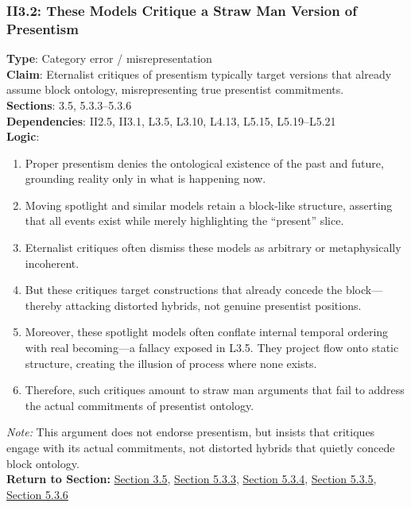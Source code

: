 \documentclass[12pt]{book}
\begin{document}
\subsubsection*{II3.2: These Models Critique a Straw Man Version of Presentism}
\label{appendix:II3.2}
\textbf{Type}: Category error / misrepresentation\\
\textbf{Claim}: Eternalist critiques of presentism typically target versions that already assume block ontology, misrepresenting true presentist commitments.\\
\textbf{Sections}: 3.5, 5.3.3–5.3.6\\
\textbf{Dependencies}: II2.5, II3.1, L3.5, L3.10, L4.13, L5.15, L5.19–L5.21\\
\textbf{Logic}:
\begin{enumerate}
    \item Proper presentism denies the ontological existence of the past and future, grounding reality only in what is happening now.
    \item Moving spotlight and similar models retain a block-like structure, asserting that all events exist while merely highlighting the ``present'' slice.
    \item Eternalist critiques often dismiss these models as arbitrary or metaphysically incoherent.
    \item But these critiques target constructions that already concede the block---thereby attacking distorted hybrids, not genuine presentist positions.
    \item Moreover, these spotlight models often conflate internal temporal ordering with real becoming---a fallacy exposed in L3.5. They project flow onto static structure, creating the illusion of process where none exists.
    \item Therefore, such critiques amount to straw man arguments that fail to address the actual commitments of presentist ontology.
\end{enumerate}
\textit{Note:} This argument does not endorse presentism, but insists that critiques engage with its actual commitments, not distorted hybrids that quietly concede block ontology.\\
\textbf{Return to Section:} \hyperref[sec:3.5]{Section 3.5}, \hyperref[sec:5.3.3]{Section 5.3.3}, \hyperref[sec:5.3.4]{Section 5.3.4}, \hyperref[sec:5.3.5]{Section 5.3.5}, \hyperref[sec:5.3.6]{Section 5.3.6}
\end{document}
